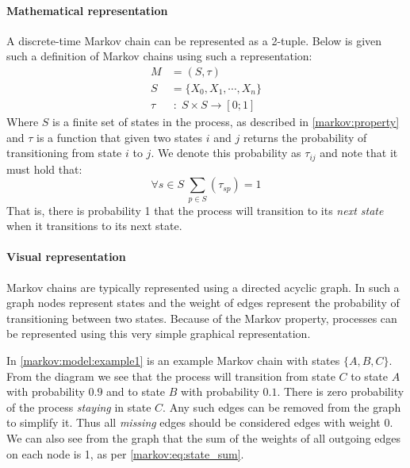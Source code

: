 \paragraph{Mathematical representation}
A discrete-time Markov chain can be represented as a 2-tuple.
Below is given such a definition of Markov chains using such a representation:
\begin{align}
M & = (S, \tau)\\
S & = \{X_0, X_1, \cdots, X_n\} \nonumber\\
\tau & \; : \; S \times S \rightarrow [0; 1] \nonumber
\end{align}
Where $S$ is a finite set of states in the process, as described in \cref{markov:property} and $\tau$ is a function that given two states $i$ and $j$ returns the probability of transitioning from state $i$ to $j$.
We denote this probability as $\tau_{ij}$ and note that it must hold that:
\begin{equation}\label{markov:eq:state_sum}
\forall s \in S \: \sum_{p \in S} (\tau_{sp}) = 1
\end{equation}
That is, there is probability 1 that the process will transition to its \emph{next state} when it transitions to its next state.

\paragraph{Visual representation}
Markov chains are typically represented using a directed acyclic graph.
In such a graph nodes represent states and the weight of edges represent the probability of transitioning between two states.
Because of the Markov property, processes can be represented using this very simple graphical representation.

In \cref{markov:model:example1} is an example Markov chain with states $\{A, B, C\}$.
From the diagram we see that the process will transition from state $C$ to state $A$ with probability $0.9$ and to state $B$ with probability $0.1$.
There is zero probability of the process \textit{staying} in state $C$.
Any such edges can be removed from the graph to simplify it.
Thus all \emph{missing} edges should be considered edges with weight 0.
We can also see from the graph that the sum of the weights of all outgoing edges on each node is 1, as per \cref{markov:eq:state_sum}.

